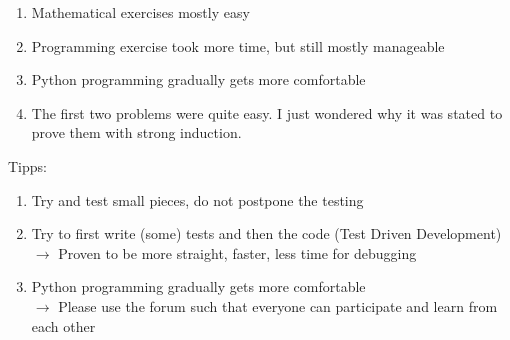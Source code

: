 \begin{frame}{\LectureFeedbackExercisesTitle}

    \begin{enumerate}
      \item
        Mathematical exercises mostly easy
      \item
        Programming exercise took more time, but still mostly manageable
      \item
        Python programming gradually gets more comfortable
      \item
        The first two problems were quite easy. I just wondered why it was stated to prove them with strong induction.
    \end{enumerate}

\end{frame}


\begin{frame}{\LectureFeedbackExercisesTitle}

    Tipps:\\
    \begin{enumerate}
      \item
        Try and test small pieces, do not postpone the testing
      \item
        Try to first write (some) tests and then the code (Test Driven Development)\\
        $\rightarrow$ Proven to be more straight, faster, less time for debugging
      \item
        Python programming gradually gets more comfortable\\
        $\rightarrow$ Please use the forum such that everyone can participate and learn from each other
    \end{enumerate}

\end{frame}
